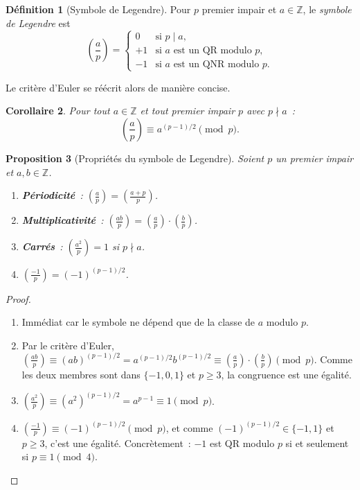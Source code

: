 \documentclass[12pt,a4paper,openany]{book}
\theoremstyle{definition}
\newtheorem{definition}{Définition}[chapter]
\theoremstyle{plain}
\newtheorem{proposition}[definition]{Proposition}
\newtheorem{corollaire}[definition]{Corollaire}
\theoremstyle{remark}
\newcommand{\Z}{\mathbb{Z}}
\newcommand{\legendre}[2]{\left(\frac{#1}{#2}\right)}
\begin{document}
\begin{definition}[Symbole de Legendre]
\label{def:legendre}
Pour $p$ premier impair et $a \in \Z$, le \emph{symbole de Legendre} est
\[
  \legendre{a}{p} =
  \begin{cases}
    0  & \text{si } p \mid a, \\
    +1 & \text{si } a \text{ est un QR modulo } p, \\
    -1 & \text{si } a \text{ est un QNR modulo } p.
  \end{cases}
\]
\end{definition}

Le critère d'Euler se réécrit alors de manière concise.

\begin{corollaire}
\label{cor:euler-legendre}
Pour tout $a \in \Z$ et tout premier impair $p$ avec $p \nmid a$~:
\[
  \legendre{a}{p} \equiv a^{(p-1)/2} \pmod{p}.
\]
\end{corollaire}

\begin{proposition}[Propriétés du symbole de Legendre]
\label{prop:legendre-proprietes}
Soient $p$ un premier impair et $a, b \in \Z$.
\begin{enumerate}[label=(\roman*)]
  \item \textbf{Périodicité}~: $\legendre{a}{p} = \legendre{a + p}{p}$.
  \item \textbf{Multiplicativité}~:
        $\legendre{ab}{p} = \legendre{a}{p} \cdot \legendre{b}{p}$.
  \item \textbf{Carrés}~: $\legendre{a^2}{p} = 1$ si $p \nmid a$.
  \item $\legendre{-1}{p} = (-1)^{(p-1)/2}$.
\end{enumerate}
\end{proposition}

\begin{proof}
\begin{enumerate}[label=(\roman*)]
  \item Immédiat car le symbole ne dépend que de la classe de $a$ modulo $p$.
  \item Par le critère d'Euler,
        $\legendre{ab}{p} \equiv (ab)^{(p-1)/2} = a^{(p-1)/2} b^{(p-1)/2}
        \equiv \legendre{a}{p} \cdot \legendre{b}{p} \pmod{p}$.
        Comme les deux membres sont dans $\{-1, 0, 1\}$ et $p \geq 3$,
        la congruence est une égalité.
  \item $\legendre{a^2}{p} \equiv (a^2)^{(p-1)/2} = a^{p-1} \equiv 1 \pmod{p}$.
  \item $\legendre{-1}{p} \equiv (-1)^{(p-1)/2} \pmod{p}$, et comme
        $(-1)^{(p-1)/2} \in \{-1, 1\}$ et $p \geq 3$, c'est une égalité.
        Concrètement~: $-1$ est QR modulo $p$ si et seulement si
        $p \equiv 1 \pmod{4}$. \qedhere
\end{enumerate}
\end{proof}
\end{document}

